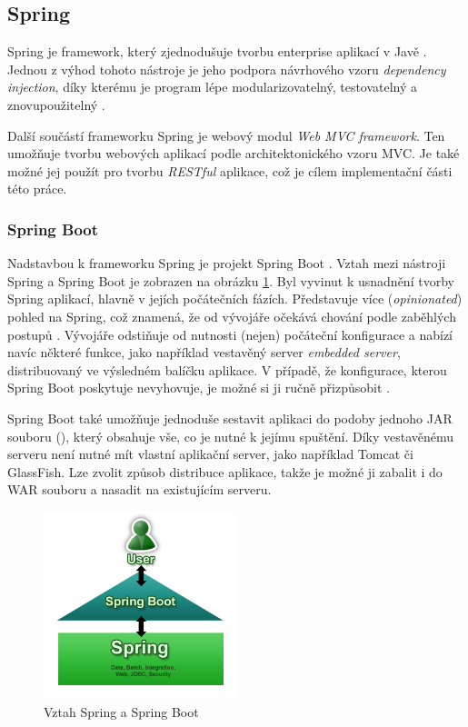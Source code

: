\documentclass[thesis=B,czech]{FITthesis}[2012/06/26]
\begin{document}
		\subsection{Spring}
			Spring je framework, který zjednodušuje tvorbu enterprise aplikací v Javě \cite{spring}. Jednou z výhod tohoto nástroje je jeho podpora návrhového vzoru \textit{dependency injection}, díky kterému je program lépe modularizovatelný, testovatelný a znovupoužitelný \cite{dependency-injection}.
			
			Další součástí frameworku Spring je webový modul \textit{Web MVC framework}. Ten umožňuje tvorbu webových aplikací podle architektonického vzoru MVC. Je také možné jej použít pro tvorbu \textit{RESTful} aplikace, což je cílem implementační části této práce.
			
			\subsubsection{Spring Boot}
				Nadstavbou k frameworku Spring je projekt Spring Boot \cite{spring-boot}. Vztah mezi nástroji Spring a Spring Boot je zobrazen na obrázku \ref{pic:spring-boot}. Byl vyvinut k usnadnění tvorby Spring aplikací, hlavně v jejích počátečních fázích. Představuje více  (\textit{opinionated}) pohled na Spring, což znamená, že od vývojáře očekává  chování podle zaběhlých postupů \cite{opinionated-software}. Vývojáře odstiňuje od nutnosti (nejen) počáteční konfigurace a nabízí navíc některé funkce, jako například vestavěný server \textit{embedded server}, distribuovaný ve výsledném balíčku aplikace. V případě, že konfigurace, kterou Spring Boot poskytuje nevyhovuje, je možné si ji ručně přizpůsobit \cite{spring-boot-blog}.
				
				Spring Boot také umožňuje jednoduše sestavit aplikaci do podoby jednoho JAR souboru (), který obsahuje vše, co je nutné k jejímu spuštění. Díky vestavěnému serveru není nutné mít vlastní aplikační server, jako například Tomcat či GlassFish. Lze zvolit způsob distribuce aplikace, takže je možné ji zabalit i do WAR souboru a nasadit na existujícím serveru.
				
				\begin{figure}\centering
					\includegraphics[width=0.5\textwidth]{spring-boot.png}
					\caption[Spring Boot]{Vztah Spring a Spring Boot \cite{spring-boot-blog}}
					\label{pic:spring-boot}
				\end{figure}
				
\end{document}
